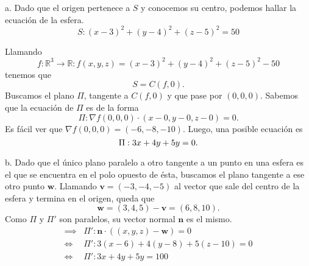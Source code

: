 \begin{solution}
    a. Dado que el origen pertenece a $S$ y conocemos su centro, podemos hallar la ecuación de la esfera.
    \[
        S:(x-3)^2 + (y-4)^2 + (z-5)^2 = 50
    \]
    \begin{center}
    \end{center}

    Llamando $$f:\mathbb{R}^3 \rightarrow \mathbb{R}:  f(x,y,z) = (x-3)^2 + (y-4)^2 + (z-5)^2 - 50$$
    tenemos que $$S=C(f,0). $$
    Buscamos el plano $\Pi$, tangente a $C(f,0)$ y que pase por $(0,0,0)$. Sabemos que la ecuación de  $\Pi$  es  de la forma
    \[
        \Pi:\nabla f(0,0,0) \cdot (x-0,y-0,z-0) = 0.
    \]
    Es f\'acil ver que $\nabla f(0,0,0) = (-6,-8,-10).$  Luego, una posible ecuaci\'on es
    \[\\[1pt]
        \Pi: 3x + 4y + 5y = 0.
    \]

    b. Dado que el único plano paralelo a otro tangente a un punto en una esfera es el que se encuentra en el polo opuesto de ésta, buscamos el plano tangente a ese otro punto $\mathbf{w}$. Llamando $\mathbf{v} = (-3,-4,-5)$ al vector que sale del centro de la esfera y termina en el origen, queda que
    \[
        \mathbf{w} = (3,4,5) - \mathbf{v} = (6,8,10).
    \]
    Como $\Pi$ y $\Pi'$ son paralelos, su vector normal $\textbf{n}$ es el mismo.
    \[
        \begin{aligned}
            \implies & \Pi ': \textbf{n} \cdot ((x,y,z) - \mathbf{w}) = 0 \\
            \iff     & \Pi ': 3(x-6) + 4(y-8) + 5(z-10) = 0               \\
            \iff     & \Pi ':3x + 4y + 5y = 100
        \end{aligned}
    \]


\end{solution}
